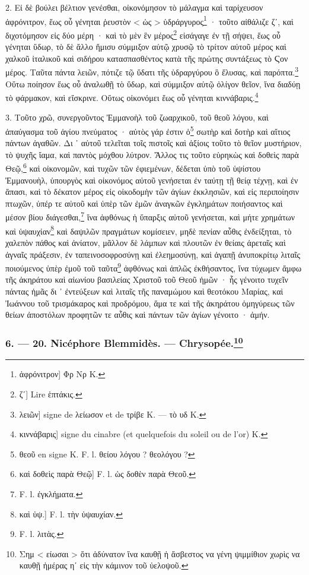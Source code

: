 \documentclass[a4paper, 11pt, oneside, polutonikogreek, french]{article}
\begin{document}
2. Εἰ δὲ βούλει βέλτιον γενέσθαι, οἰκονόμησον τὸ μάλαγμα καὶ ταρίχευσον ἀφρόνιτρον, ἕως οὗ γένηται ῥευστὸν < ὡς > ὑδράργυρος\footnote{ἀφρόνιτρον] Φρ Νρ K.} · τοῦτο αἰθάλιζε ζʹ, καὶ διχοτόμησον εἰς δύο μέρη · καὶ τὸ μὲν ἓν μέρος\footnote{ζʹ] Lire ἑπτάκις.} εἰσάγαγε ἐν τῇ σήψει, ἕως οὗ γένηται ὕδωρ, τὸ δὲ ἄλλο ἥμισυ σύμμιξον αὐτῷ χρυσῷ τὸ τρίτον αὐτοῦ μέρος καὶ χαλκοῦ ἰταλικοῦ καὶ σιδήρου κατασπασθέντος κατὰ τῆς πρώτης συντάξεως τὸ Ϛον μέρος. Ταῦτα πάντα λειῶν, πότιζε τῷ ὕδατι τῆς ὑδραργύρου ὃ ἔλυσας, καὶ παρόπτα.\footnote{λειῶν] signe de λείωσον et de τρίβε K. --- τὸ υδ K.} Οὕτω ποίησον ἕως οὗ ἀναλωθῇ τὸ ὕδωρ, καὶ σύμμιξον αὐτῷ ὀλίγον θεῖον, ἵνα διαδύῃ τὸ φάρμακον, καὶ εἴσκρινε. Οὕτως οἰκονόμει ἕως οὗ γένηται κιννάβαρις.\footnote{κιννάβαρις] signe du cinabre (et quelquefois du soleil ou de l'or) K.}

3. Τοῦτο χρῶ, συνεργοῦντος Ἐμμανοὴλ τοῦ ζωαρχικοῦ, τοῦ θεοῦ λόγου, καὶ ἀπαύγασμα τοῦ ἁγίου πνεύματος · αὐτὸς γάρ ἐστιν ὁ\footnote{θεοῦ en signe K. F. l. θείου λόγου ? θεολόγου ?} σωτὴρ καὶ δοτὴρ καὶ αἴτιος πάντων ἀγαθῶν. Δι ᾽ αὐτοῦ τελεῖται τοῖς πιστοῖς καὶ ἀξίοις τοῦτο τὸ θεῖον μυστήριον, τὸ ψυχῆς ἴαμα, καὶ παντὸς μόχθου λύτρον. Ἄλλος τις τοῦτο εὑρηκὼς καὶ δοθεὶς παρὰ Θεῷ,\footnote{καὶ δοθεὶς παρὰ Θεῷ] F. l. ὡς δοθὲν παρὰ Θεοῦ.} καὶ οἰκονομῶν, καὶ τυχῶν τῶν ἐφιεμένων, δέδεται ὑπὸ τοῦ ὑψίστου Ἐμμανουὴλ, ὑπουργὸς καὶ οἰκονόμος αὐτοῦ γενήσεται ἐν ταύτῃ τῇ θείᾳ τέχνῃ, καὶ ἐν ἅπασι, καὶ τὸ δέκατον μέρος εἰς οἰκοδομὴν τῶν ἀγίων ἐκκλησιῶν, καὶ εἰς περιποίησιν πτωχῶν, ὐπέρ τε αὐτοῦ καὶ ὑπὲρ τῶν ἐμῶν ἀναγκῶν ἐγκλημάτων ποιήσαντος καὶ μέσον βίου διάγεσθαι,\footnote{F. l. ἐγκλήματα.} ἵνα ἀφθόνως ἡ ὕπαρξις αὐτοῦ γενήσεται, καὶ μήτε χρημάτων καὶ ὑψαυχίαν\footnote{καὶ ὑψ.] F. l. τὴν ὑψαυχίαν.} καὶ δαψιλῶν πραγμάτων κομίσειεν, μηδὲ πενίαν αὖθις ἐνδείξηται, τὸ χαλεπὸν πάθος καὶ ἀνίατον, μᾶλλον δὲ λάμπων καὶ πλουτῶν ἐν θείαις ἀρεταῖς καὶ ἁγναῖς πράξεσιν, ἐν ταπεινοσοφροσύνῃ καὶ ἐλεημοσύνῃ, καὶ ἀγαπῇ ἀνυποκρίτῳ λιταῖς ποιούμενος ὑπὲρ ἐμοῦ τοῦ ταῦτα\footnote{F. l. λιτὰς.} ἀφθόνως καὶ ἁπλῶς ἐκθήσαντος, ἵνα τύχωμεν ἄμφω τῆς ἀκηράτου καὶ αἰωνίου βασιλείας Χριστοῦ τοῦ Θεοῦ ἡμῶν · ἧς γένοιτο τυχεῖν πάντας ἡμᾶς δι ᾽ ἐντεύξεων καὶ λιταῖς τῆς παναμώμου καὶ θεοτόκου Μαρίας, καὶ Ἰωάννου τοῦ τρισμάκαρος καὶ προδρόμου, ἅμα τε καὶ τῆς ἀκηράτου ὁμηγύρεως τῶν θείων ἀποστόλων προφητῶν τε αὖθις καὶ πάντων τῶν ἀγίων γένοιτο · ἀμήν.

\bigskip
\centerline{\EightStarTaper}
\centerline{\EightStarTaper\EightStarTaper}
\bigskip

\subsubsection[6. --- 20. Nicéphore Blemmidès. --- Chrysopée.]{6. --- 20. Nicéphore Blemmidès. --- Chrysopée.\footnote{Σημ < είωσαι > ὅτι ἀδύνατον ἵνα καυθῇ ἡ ἄσβεστος να γένη ψιμμίθιον χωρὶς να καυθῇ ἡμέρας ηʹ εἰς τὴν κάμινον τοῦ ὑελοψοῦ.}}
\end{document}
